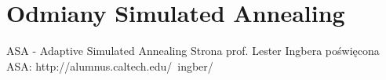 \section{Odmiany Simulated Annealing}



ASA - Adaptive Simulated Annealing
Strona prof. Lester Ingbera poświęcona ASA:
http://alumnus.caltech.edu/~ingber/




